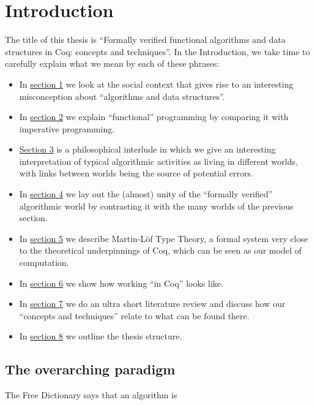 \documentclass[declaration,mgr,english,shortabstract]{iithesis}
\author         {Wojciech Kołowski}
\date           {\sout{Czerwiec '20 chyba że koronawirus} \\ \sout{Jednak raczej wrzesień} \\ Z września też nici, ale spoko} %
\begin{document}

\chapter{Introduction} \label{ch1}

The title of this thesis is ``Formally verified functional algorithms and data structures in Coq: concepts and techniques''. In the Introduction, we take time to carefully explain what we mean by each of these phrases:

\begin{itemize}
    \item In \hyperref[paradigm]{section 1} we look at the social context that gives rise to an interesting misconception about ``algorithms and data structures''.
    \item In \hyperref[impfun]{section 2} we explain ``functional'' programming by comparing it with imperative programming.
    \item \hyperref[worlds]{Section 3} is a philosophical interlude in which we give an interesting interpretation of typical algorithmic activities as living in different worlds, with links between worlds being the source of potential errors.
    \item In \hyperref[formal]{section 4} we lay out the (almost) unity of the ``formally verified'' algorithmic world by contrasting it with the many worlds of the previous section.
    \item In \hyperref[mltt]{section 5} we describe Martin-L\"{o}f Type Theory, a formal system very close to the theoretical underpinnings of Coq, which can be seen as our model of computation.
    \item In \hyperref[coq]{section 6} we show how working ``in Coq'' looks like.
    \item In \hyperref[literature]{section 7} we do an ultra short literature review and discuss how our ``concepts and techniques'' relate to what can be found there.
    \item In \hyperref[outline]{section 8} we outline the thesis structure.
\end{itemize}

\section{The overarching paradigm} \label{paradigm}

The Free Dictionary says \cite{TheFreeDictionary} that an algorithm is
\end{document}
